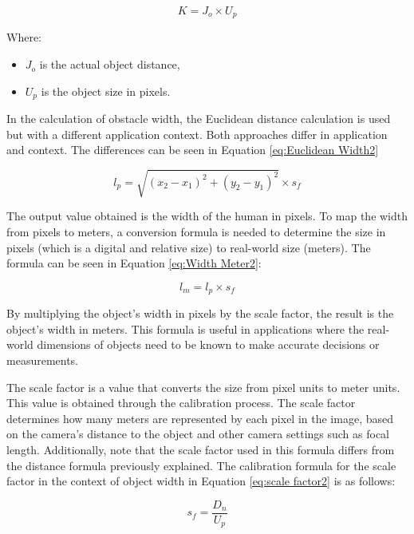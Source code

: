 \begin{equation}
\label{eq:K value}
K = J_o \times U_p
\end{equation}

Where:
\begin{itemize}
\item $J_o$ is the actual object distance,
\item $U_p$ is the object size in pixels.
\end{itemize}

In the calculation of obstacle width, the Euclidean distance calculation is used but with a different application context. Both approaches differ in application and context. The differences can be seen in Equation \ref{eq:Euclidean Width2}

\begin{equation}
\label{eq:Euclidean Width2}
l_p = \sqrt{(x_2 - x_1)^2 + (y_2 - y_1)^2} \times s_f
\end{equation}

The output value obtained is the width of the human in pixels. To map the width from pixels to meters, a conversion formula is needed to determine the size in pixels (which is a digital and relative size) to real-world size (meters). The formula can be seen in Equation \ref{eq:Width Meter2}:

\begin{equation}
\label{eq:Width Meter2}
l_m = l_p \times s_f
\end{equation}

By multiplying the object's width in pixels by the scale factor, the result is the object's width in meters. This formula is useful in applications where the real-world dimensions of objects need to be known to make accurate decisions or measurements.

The scale factor is a value that converts the size from pixel units to meter units. This value is obtained through the calibration process. The scale factor determines how many meters are represented by each pixel in the image, based on the camera's distance to the object and other camera settings such as focal length. Additionally, note that the scale factor used in this formula differs from the distance formula previously explained. The calibration formula for the scale factor in the context of object width in Equation \ref{eq:scale factor2} is as follows:

\begin{equation}
\label{eq:scale factor2}
s_f = \frac{D_n}{U_p}
\end{equation}

